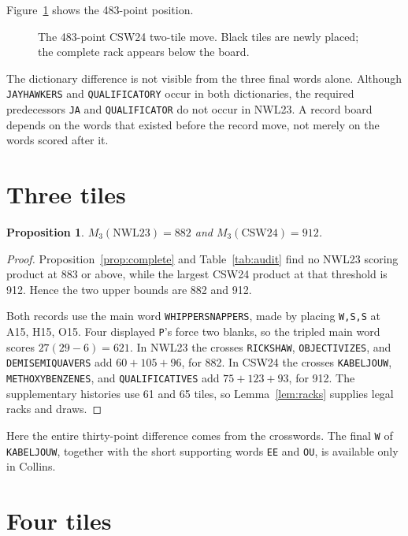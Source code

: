 \documentclass{article}
\theoremstyle{plain}
\newtheorem{proposition}[theorem]{Proposition}
\newcommand{\word}[1]{\texttt{#1}}
\begin{document}
Figure~\ref{fig:two} shows the 483-point position.

\begin{figure}[t]\centering

\caption{The 483-point CSW24 two-tile move. Black tiles are newly placed; the
complete rack appears below the board.}\label{fig:two}
\end{figure}

The dictionary difference is not visible from the three final words alone.
Although \word{JAYHAWKERS} and \word{QUALIFICATORY} occur in both dictionaries,
the required predecessors \word{JA} and \word{QUALIFICATOR} do not occur in
NWL23. A record board depends on the words that existed before the record move,
not merely on the words scored after it.

\section{Three tiles}

\begin{proposition}\label{prop:three}
$M_3(\mathrm{NWL23})=882$ and $M_3(\mathrm{CSW24})=912$.
\end{proposition}
\begin{proof}
Proposition~\ref{prop:complete} and Table~\ref{tab:audit} find no NWL23 scoring
product at 883 or above, while the largest CSW24 product at that threshold is
912. Hence the two upper bounds are 882 and 912.

Both records use the main word \word{WHIPPERSNAPPERS}, made by placing
\word{W,S,S} at A15, H15, O15. Four displayed \word{P}'s force two blanks, so
the tripled main word scores $27(29-6)=621$. In NWL23 the crosses
\word{RICKSHAW}, \word{OBJECTIVIZES}, and \word{DEMISEMIQUAVERS} add
$60+105+96$, for 882. In CSW24 the crosses \word{KABELJOUW},
\word{METHOXYBENZENES}, and \word{QUALIFICATIVES} add $75+123+93$, for
912. The supplementary histories use 61 and 65 tiles, so
Lemma~\ref{lem:racks} supplies legal racks and draws.
\end{proof}

Here the entire thirty-point difference comes from the crosswords. The final
\word{W} of \word{KABELJOUW}, together with the short supporting words
\word{EE} and \word{OU}, is available only in Collins.

\section{Four tiles}
\end{document}
